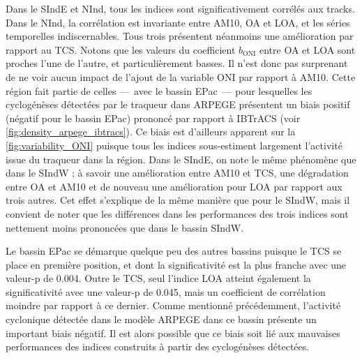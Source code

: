 \documentclass[../main.tex]{subfiles}
\begin{document}
Dans le SIndE et NInd, tous les indices sont significativement corrélés aux tracks. Dans le NInd, la corrélation est invariante entre AM10, OA et LOA, et les
séries temporelles indiscernables. Tous trois présentent néanmoins une amélioration par rapport au TCS. Notons que les valeurs du coefficient $b_{\mathrm{ONI}}$
entre OA et LOA sont proches l'une de l'autre, et particulièrement basses. Il n'est donc pas surprenant de ne voir aucun impact de l'ajout de la variable ONI
par rapport à AM10. Cette région fait partie de celles ---~avec le bassin EPac~--- pour lesquelles les cyclogénèses détectées par le traqueur dans ARPEGE
présentent un biais positif (négatif pour le bassin EPac) prononcé par rapport à IBTrACS (voir \cref{fig:density_arpege_ibtracs}). Ce biais est d'ailleurs
apparent sur la \cref{fig:variability_ONI} puisque tous les indices sous-estiment largement l'activité issue du traqueur dans la région. Dans le SIndE, on note
le même phénomène que dans le SIndW ; à savoir une amélioration entre AM10 et TCS, une dégradation entre OA et AM10 et de nouveau une amélioration pour LOA par
rapport aux trois autres. Cet effet s'explique de la même manière que pour le SIndW, mais il convient de noter que les différences dans les performances des
trois indices sont nettement moins prononcées que dans le bassin SIndW.

Le bassin EPac se démarque quelque peu des autres bassins puisque le TCS se place en première position, et dont la significativité est la plus franche avec une
valeur-p de \num{0.004}. Outre le TCS, seul l'indice LOA atteint également la significativité avec une valeur-p de \num{0.045}, mais un coefficient de
corrélation moindre par rapport à ce dernier. Comme mentionné précédemment, l'activité cyclonique détectée dans le modèle ARPEGE dans ce bassin présente un
important biais négatif. Il est alors possible que ce biais soit lié aux mauvaises performances des indices construits à partir des cyclogénèses détectées.
\end{document}

